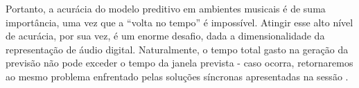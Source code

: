 Portanto, a acurácia do modelo preditivo em ambientes musicais é de suma importância, uma vez que a ``volta no tempo'' é impossível. Atingir esse alto nível de acurácia, por sua vez, é um enorme desafio, dada a dimensionalidade da representação de áudio digital. Naturalmente, o tempo total gasto na geração da previsão não pode exceder o tempo da janela prevista - caso ocorra, retornaremos ao mesmo problema enfrentado pelas soluções síncronas apresentadas na sessão .





